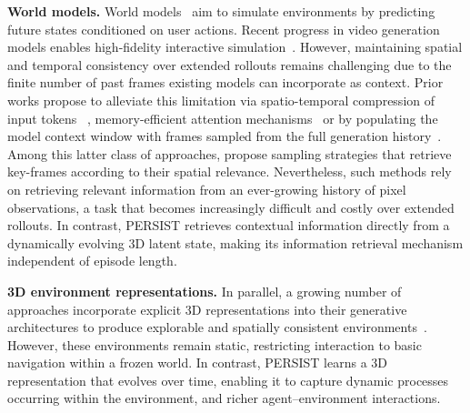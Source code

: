 \textbf{World models.} World models~\citep{haworldmodels2018} aim to simulate environments by predicting future states conditioned on user actions. Recent progress in video generation models enables high-fidelity interactive simulation~\citep{genie3,alonso2024diffusion,decart2024oasis}. However, maintaining spatial and temporal consistency over extended rollouts remains challenging due to the finite number of past frames existing models can incorporate as context. Prior works propose to alleviate this limitation via spatio-temporal compression of input tokens ~\citep{hafner2025training}, memory-efficient attention mechanisms~\citep{po2025long} or by populating the model context window with frames sampled from the full generation history~\citep{song2025history}. Among this latter class of approaches, \cite{xiao2025worldmem,huang2025memory} propose sampling strategies that retrieve key-frames according to their spatial relevance. Nevertheless, such methods rely on retrieving relevant information from an ever-growing history of pixel observations, a task that becomes increasingly difficult and costly over extended rollouts. In contrast, PERSIST retrieves contextual information directly from a dynamically evolving 3D latent state, making its information retrieval mechanism independent of episode length.

\textbf{3D environment representations.} In parallel, a growing number of approaches incorporate explicit 3D representations into their generative architectures to produce explorable and spatially consistent environments~\citep{huang2025voyager,marble,zhou2025learning}. However, these environments remain static, restricting interaction to basic navigation within a frozen world. In contrast, PERSIST learns a 3D representation that evolves over time, enabling it to capture dynamic processes occurring within the environment, and richer agent–environment interactions.

